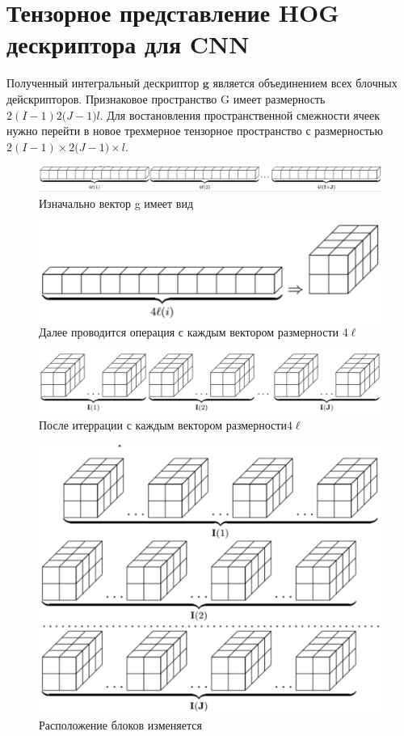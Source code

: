\documentclass[12pt,twoside]{article}
\begin{document}
\section{Тензорное представление HOG дескриптора для CNN}
Полученный интегральный дескриптор $\textbf{g}$ является объединением всех блочных дейскрипторов. Признаковое пространство G имеет размерность ${2(I-1)}{2(J-1}){l}$. Для востановления пространственной смежности ячеек нужно перейти в новое трехмерное тензорное пространство с размерностью  ${2(I-1)}\times{2(J-1})\times{l}$. \\
\begin{center}
	
	\begin{figure}
		\includegraphics[width=\linewidth]{1}
		\caption{Изначально вектор g имеет вид}
	\end{figure}
	
	\begin{figure}
		\includegraphics[width=0.7\linewidth]{2}
		\caption{Далее проводится операция с каждым вектором размерности $4 \ell$ }
	\end{figure}
	
	\begin{figure}
		\includegraphics[width=0.9\linewidth]{3}
		\caption{После итеррации с каждым вектором размерности$4 \ell$ }
	\end{figure}
	
	\begin{figure}
		\includegraphics[width=0.7\linewidth]{4}
		\caption{Расположение блоков изменяется}
	\end{figure}
	
\end{center}
\end{document}
